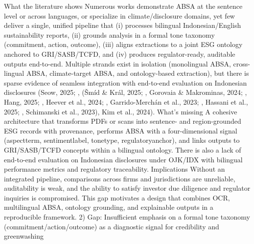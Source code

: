 What the literature shows
Numerous works demonstrate ABSA at the sentence level or across languages, or specialize in climate/disclosure domains, yet few deliver a single, unified pipeline that (i) processes bilingual Indonesian/English sustainability reports, (ii) grounds analysis in a formal tone taxonomy (commitment, action, outcome), (iii) aligns extractions to a joint ESG ontology anchored to GRI/SASB/TCFD, and (iv) produces regulator-ready, auditable outputs end-to-end. Multiple strands exist in isolation (monolingual ABSA, cross-lingual ABSA, climate-target ABSA, and ontology-based extraction), but there is sparse evidence of seamless integration with end-to-end evaluation on Indonesian disclosures (Seow, 2025; , (Šmíd & Král, 2025; , Gorovaia & Makrominas, 2024; , Hang, 2025; , Heever et al., 2024; , Garrido-Merchán et al., 2023; , Hassani et al., 2025; , Schimanski et al., 2023), Kim et al., 2024).
What’s missing
A cohesive architecture that transforms PDFs or scans into sentence- and region-grounded ESG records with provenance, performs ABSA with a four-dimensional signal (aspectterm, sentimentlabel, tonetype, regulatoryanchor), and links outputs to GRI/SASB/TCFD concepts within a bilingual ontology. There is also a lack of end-to-end evaluation on Indonesian disclosures under OJK/IDX with bilingual performance metrics and regulatory traceability.
Implications
Without an integrated pipeline, comparisons across firms and jurisdictions are unreliable, auditability is weak, and the ability to satisfy investor due diligence and regulator inquiries is compromised. This gap motivates a design that combines OCR, multilingual ABSA, ontology grounding, and explainable outputs in a reproducible framework.
2) Gap: Insufficient emphasis on a formal tone taxonomy (commitment/action/outcome) as a diagnostic signal for credibility and greenwashing

